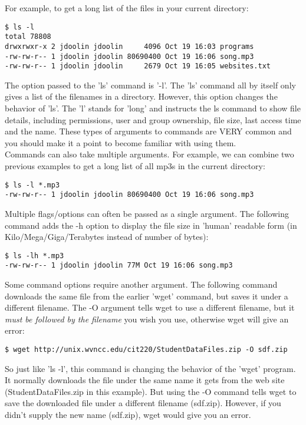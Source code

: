 For example, to get a long list of the files in your current directory:
\begin{verbatim}
$ ls -l
total 78808
drwxrwxr-x 2 jdoolin jdoolin     4096 Oct 19 16:03 programs
-rw-rw-r-- 1 jdoolin jdoolin 80690400 Oct 19 16:06 song.mp3
-rw-rw-r-- 1 jdoolin jdoolin     2679 Oct 19 16:05 websites.txt
\end{verbatim}

The option passed to the 'ls' command is '-l'.  The 'ls' command all by itself only gives a list of the filenames in a directory.  However, this option changes the behavior of 'ls'.  The 'l' stands for 'long' and instructs the ls command to show file details, including permissions, user and group ownership, file size, last access time and the name.  These types of arguments to commands are VERY common and you should make it a point to become familiar with using them.\\

Commands can also take multiple arguments.  For example, we can combine two previous examples to get a long list of all mp3s in the current directory:
\begin{verbatim}
$ ls -l *.mp3
-rw-rw-r-- 1 jdoolin jdoolin 80690400 Oct 19 16:06 song.mp3
\end{verbatim}

Multiple flags/options can often be passed as a single argument.  The following command adds the -h option to display the file size in 'human' readable form (in Kilo/Mega/Giga/Terabytes instead of number of bytes):

\begin{verbatim}
$ ls -lh *.mp3
-rw-rw-r-- 1 jdoolin jdoolin 77M Oct 19 16:06 song.mp3
\end{verbatim}

Some command options require another argument.  The following command downloads the same file from the earlier 'wget' command, but saves it under a different filename.  The -O argument tells wget to use a different filename, but it \textit{must be followed by the filename} you wish you use, otherwise wget will give an error:
\begin{verbatim}
$ wget http://unix.wvncc.edu/cit220/StudentDataFiles.zip -O sdf.zip
\end{verbatim}

So just like 'ls -l', this command is changing the behavior of the 'wget' program.  It normally downloads the file under the same name it gets from the web site (StudentDataFiles.zip in this example).  But using the -O command tells wget to save the downloaded file under a different filename (sdf.zip).  However, if you didn't supply the new name (sdf.zip), wget would give you an error.\\  


